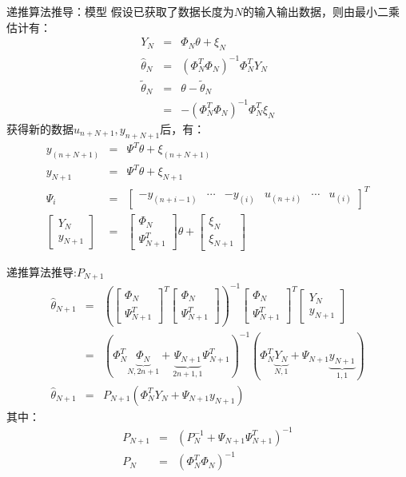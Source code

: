 \begin{frame}{递推算法推导：模型}
假设已获取了数据长度为$N$的输入输出数据，则由最小二乘估计有：
\begin{eqnarray*}
Y_N &=& \Phi_N\theta+\xi_N \\
\hat\theta_N &=& (\Phi_N^T\Phi_N)^{-1}\Phi_N^T Y_N \\
\tilde\theta_N &=& \theta-\tilde\theta_N \\
&=& -(\Phi_N^T\Phi_N)^{-1}\Phi_N^T\xi_N
\end{eqnarray*}
获得新的数据$u_{n+N+1},y_{n+N+1}$后，有：
\begin{eqnarray*}
y_{(n+N+1)} &=& \Psi^T\theta+\xi_{(n+N+1)} \\
y_{N+1} &=& \Psi^T\theta+\xi_{N+1} \\
\Psi_i &=& \begin{bmatrix} -y_{(n+i-1)} & \cdots & -y_{(i)} & u_{(n+i)} & \cdots & u_{(i)} \end{bmatrix}^T  \\
\begin{bmatrix} Y_N \\ y_{N+1} \end{bmatrix} &=& 
\begin{bmatrix} \Phi_N \\ \Psi_{N+1}^T \end{bmatrix} \theta +
\begin{bmatrix} \xi_N \\ \xi_{N+1} \end{bmatrix} 
\end{eqnarray*}
\end{frame}

\bgroup
{}
\begin{frame}{递推算法推导:$P_{N+1}$}
\begin{eqnarray*}
\hat\theta_{N+1} &=&
\left(
\begin{bmatrix} \Phi_N \\ \Psi_{N+1}^T\end{bmatrix}^T
\begin{bmatrix} \Phi_N \\ \Psi_{N+1}^T\end{bmatrix}
\right)^{-1}
\begin{bmatrix} \Phi_N \\ \Psi_{N+1}^T\end{bmatrix}^T
\begin{bmatrix} Y_N \\ y_{N+1}\end{bmatrix} \\
&=& (\Phi_N^T\underbrace{\Phi_N}_{N,2n+1}+\underbrace{\Psi_{N+1}}_{2n+1,1}\Psi_{N+1}^T)^{-1}(\Phi_N^T \underbrace{Y_N}_{N,1} +\Psi_{N+1}\underbrace{y_{N+1}}_{1,1})  \\
\hat\theta_{N+1} &=& P_{N+1}(\Phi_N^T Y_N + \Psi_{N+1} y_{N+1}) 
\end{eqnarray*}
其中：
\begin{eqnarray*}
P_{N+1} &=&(P_N^{-1}+\Psi_{N+1}\Psi_{N+1}^T)^{-1} \\
P_{N} &=& (\Phi_N^T\Phi_N)^{-1}
\end{eqnarray*}
\end{frame}
\egroup


